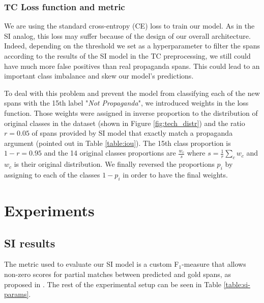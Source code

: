 \documentclass[11pt]{article}
\newcommand{\pol}[1]{{\fontfamily{pcr}\selectfont#1}}
\begin{document}
\subsubsection{\pol{TC} Loss function and metric}
We are using the standard cross-entropy (CE) loss to train our model. As in the \pol{SI} analog, this loss may suffer because of the design of our overall architecture. Indeed, depending on the threshold we set as a hyperparameter to filter the spans according to the results of the \pol{SI} model in the \pol{TC} preprocessing, we still could have much more false positives than real propaganda spans. This could lead to an important class imbalance and skew our model's predictions.

To deal with this problem and prevent the model from classifying each of the new spans with the 15th label "\textit{Not Propaganda}", we introduced weights in the loss function. Those weights were assigned in inverse proportion to the distribution of original classes in the dataset (shown in Figure \ref{fig:tech_distr}) and the ratio $r = 0.05$ of spans provided by \pol{SI} model that exactly match a propaganda argument (pointed out in Table \ref{table:iou}). The 15th class proportion is $1-r = 0.95$ and the 14 original classes proportions are $\frac{w_c}{s}$ where $s = \frac{1}{r} \sum_c w_c$ and $w_c$ is their original distribution. We finally reversed the proportions $p_i$ by assigning to each of the classes $1-p_i$ in order to have the final weights.


\section{Experiments}

\subsection{\pol{SI} results} \label{sec:si-results}
The metric used to evaluate our \pol{SI} model is a custom F$_1$-measure that allows non-zero scores for partial matches between predicted and gold spans, as proposed in \cite{semeval}. The rest of the experimental setup can be seen in Table \ref{table:si-params}.
\end{document}
